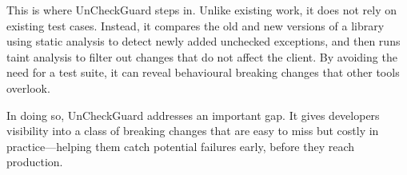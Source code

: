 This is where UnCheckGuard steps in. Unlike existing work, it does not rely on existing test cases. Instead, it compares the old and new versions of a library using static analysis to detect newly added unchecked exceptions, and then runs taint analysis to filter out changes that do not affect the client. By avoiding the need for a test suite, it can reveal behavioural breaking changes that other tools overlook.

In doing so, UnCheckGuard addresses an important gap. It gives developers visibility into a class of breaking changes that are easy to miss but costly in practice—helping them catch potential failures early, before they reach production.
